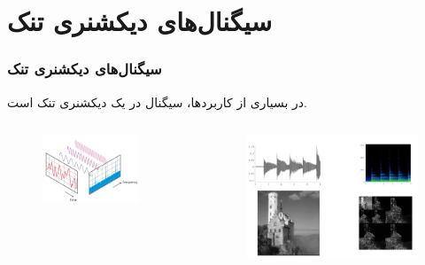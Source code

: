 \section{سیگنال‌های دیکشنری تنک\hfill}
\begin{frame}
\frametitle{سیگنال‌های دیکشنری تنک}
\begin{block}{}
\begin{center}
در بسیاری از کاربرد‌ها، سیگنال در یک دیکشنری تنک است.
\end{center}
\end{block}
\begin{columns}
\begin{figure}
\centering
\includegraphics[scale=0.3]{Images/DS.png}
\end{figure}
\begin{scriptsize}
\cite{nam2013cosparse,Candes2011}
\end{scriptsize}
\begin{figure}
\centering
\includegraphics[scale=0.13]{Images/DS1.png}
\end{figure}
\end{columns}
\end{frame}

